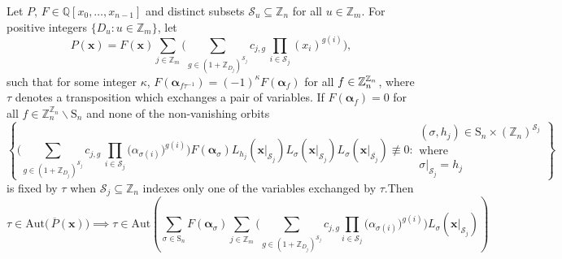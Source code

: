 \begin{lemma} \label{lem:symmetrization Lemma}
Let $P,\,F\in\mathbb{Q}\left[x_{0},\ldots,x_{n-1}\right]$
and distinct subsets $\mathscr{S}_{u}\subseteq\mathbb{Z}_{n}$ for all $u\in\mathbb{Z}_{m}$. For positive integers $\{D_{u}:u\in\mathbb{Z}_{m}\}$, let
\begin{equation}
P(\mathbf{x})=F(\mathbf{x})\sum_{j\in\mathbb{Z}_{m}}\big(\sum_{g\in(1+\mathbb{Z}_{D_{j}})^{\mathscr{S}_{j}}}c_{j,g}\,\prod_{i\in \mathscr{S}_{j}}(x_{i})^{g(i)}\big),
\end{equation}
such that for some integer $\kappa$, $F(\boldsymbol{\alpha}_{f\tau^{-1}})=(-1)^{\kappa} F(\boldsymbol{\alpha}_{f})$  
 for all $f\in {\mathbb Z}_{n}^{{\mathbb Z}_{n}}$,
 where $\tau$ denotes a transposition  which exchanges a pair of variables. If  $F(\boldsymbol{\alpha}_{f})=0$ for all $f\in \mathbb{Z}_{n}^{\mathbb{Z}_{n}}\backslash\text{S}_{n}$ and none of the non-vanishing orbits
 \[
\left\{ \bigg(\sum_{g\in(1+\mathbb{Z}_{D_{j}})^{\mathscr{S}_{j}}}c_{j,g}\,\prod_{i\in\mathscr{S}_{j}}\big(\alpha_{\sigma(i)}\big)^{g(i)}\bigg)F(\boldsymbol{\alpha}_{\sigma})L_{h_{j}}(\mathbf{x}|_{\mathscr{S}_{j}})L_{\sigma}(\mathbf{x}|_{\mathscr{S}_{j}})L_{\sigma}(\mathbf{x}|_{\overline{\mathscr{S}_{j}}})\not\equiv0:\begin{array}{c}
(\sigma,h_{j})\in\text{S}_{n}\times(\mathbb{Z}_{n})^{\mathscr{S}_{j}}\\
\text{where}\\
\sigma|_{\mathscr{S}_{j}}=h_{j}
\end{array}\right\} 
 \]
is fixed by $\tau$ when $\mathscr{S}_{j}\subseteq\mathbb{Z}_{n}$ indexes only one of the variables exchanged by $\tau$.Then
\[
\tau\in\textrm{Aut}\big(\,\overline{P}(\mathbf{x})\big)\implies\tau\in\textrm{Aut}\left(\sum_{\sigma\in\text{S}_{n}}F(\boldsymbol{\alpha}_{\sigma})\sum_{j\in\mathbb{Z}_{m}}\bigg(\sum_{g\in(1+\mathbb{Z}_{D_{j}})^{\mathscr{S}_{j}}}c_{j,g}\prod_{i\in\mathscr{S}_{j}}\big(\alpha_{\sigma(i)}\big)^{g(i)}\bigg)L_{\sigma}(\mathbf{x}|_{\mathscr{S}_{j}})\right)
\]
\end{lemma}
